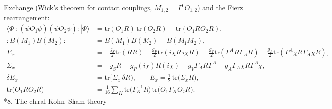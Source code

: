 \documentclass[10pt,a4paper]{article}
\makeatletter
\renewcommand\section{\@startsection{section}{1}{\z@}{-3.5ex \@plus -1ex \@minus -.2ex}{2.3ex \@plus.2ex}{\normalfont\Large\bfseries\raggedright}}
\makeatother
\begin{document}
Exchange (Wick’s theorem for contact couplings, $M_{1,2}=\Gamma^0O_{1,2}$) and the Fierz rearrangement:
\begin{align*}
\langle\Phi|:(\bar\psi O_1\psi)(\bar\psi O_2\psi):|\Phi\rangle&=\mathrm{tr}(O_1R)\,\mathrm{tr}(O_2R)-\mathrm{tr}(O_1RO_2R), \\
:\!B(M_1)B(M_2)\!:\;&=B(M_1)B(M_2)-B(M_1M_2), \\
E_x&=-\frac{g_S}2\mathrm{tr}(RR)-\frac{g_P}2\mathrm{tr}(i\chi R\,i\chi R)-\frac{g_V}2\mathrm{tr}(\Gamma^AR\Gamma_AR)-\frac{g_A}2\mathrm{tr}(\Gamma^A\chi R\Gamma_A\chi R), \\
\Sigma_x&=-g_SR-g_P(i\chi)R(i\chi)-g_V\Gamma_AR\Gamma^A-g_A\Gamma_A\chi R\Gamma^A\chi, \\
\delta E_x&=\mathrm{tr}\big(\Sigma_x\,\delta R\big),\qquad E_x=\tfrac12\,\mathrm{tr}\big(\Sigma_xR\big), \\
\mathrm{tr}\big(O_1RO_2R\big)&=\frac1{16}\sum_K\mathrm{tr}\big(\Gamma_K^{-1}R\big)\,\mathrm{tr}\big(O_1\Gamma_KO_2R\big).
\end{align*}
\section*{8. The chiral Kohn–Sham theory}
\end{document}
